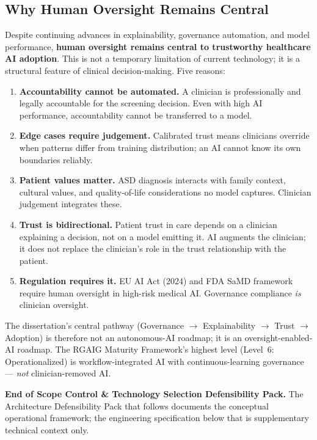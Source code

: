 \subsection*{Why Human Oversight Remains Central}
\label{sec:appo_human_oversight}

\noindent Despite continuing advances in explainability, governance automation, and model performance, \textbf{human oversight remains central to trustworthy healthcare AI adoption}. This is not a temporary limitation of current technology; it is a structural feature of clinical decision-making. Five reasons:

\begin{enumerate}[leftmargin=*, itemsep=2pt]
    \item \textbf{Accountability cannot be automated.} A clinician is professionally and legally accountable for the screening decision. Even with high AI performance, accountability cannot be transferred to a model.
    \item \textbf{Edge cases require judgement.} Calibrated trust means clinicians override when patterns differ from training distribution; an AI cannot know its own boundaries reliably.
    \item \textbf{Patient values matter.} ASD diagnosis interacts with family context, cultural values, and quality-of-life considerations no model captures. Clinician judgement integrates these.
    \item \textbf{Trust is bidirectional.} Patient trust in care depends on a clinician explaining a decision, not on a model emitting it. AI augments the clinician; it does not replace the clinician's role in the trust relationship with the patient.
    \item \textbf{Regulation requires it.} EU AI Act (2024) and FDA SaMD framework require human oversight in high-risk medical AI. Governance compliance \emph{is} clinician oversight.
\end{enumerate}

\noindent The dissertation's central pathway (Governance $\to$ Explainability $\to$ Trust $\to$ Adoption) is therefore not an autonomous-AI roadmap; it is an oversight-enabled-AI roadmap. The RGAIG Maturity Framework's highest level (Level~6: Operationalized) is workflow-integrated AI with continuous-learning governance --- \emph{not} clinician-removed AI.

\noindent\textbf{End of Scope Control \& Technology Selection Defensibility Pack.} The Architecture Defensibility Pack that follows documents the conceptual operational framework; the engineering specification below that is supplementary technical context only.

